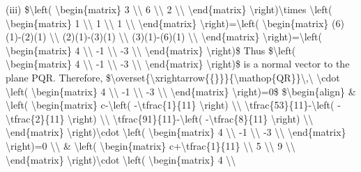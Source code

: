 (iii) \$\textbackslash left( \textbackslash begin\{matrix\} 3 \textbackslash\textbackslash{}
6 \textbackslash\textbackslash{} 2 \textbackslash\textbackslash{}
\textbackslash end\{matrix\} \textbackslash right)\textbackslash times
\textbackslash left( \textbackslash begin\{matrix\} 1 \textbackslash\textbackslash{}
1 \textbackslash\textbackslash{} 1 \textbackslash\textbackslash{}
\textbackslash end\{matrix\} \textbackslash right)=\textbackslash left(
\textbackslash begin\{matrix\} (6)(1)-(2)(1) \textbackslash\textbackslash{}
(2)(1)-(3)(1) \textbackslash\textbackslash{} (3)(1)-(6)(1) \textbackslash\textbackslash{}
\textbackslash end\{matrix\} \textbackslash right)=\textbackslash left(
\textbackslash begin\{matrix\} 4 \textbackslash\textbackslash{}
-1 \textbackslash\textbackslash{} -3 \textbackslash\textbackslash{}
\textbackslash end\{matrix\} \textbackslash right)\$ Thus \$\textbackslash left(
\textbackslash begin\{matrix\} 4 \textbackslash\textbackslash{}
-1 \textbackslash\textbackslash{} -3 \textbackslash\textbackslash{}
\textbackslash end\{matrix\} \textbackslash right)\$ is a normal
vector to the plane PQR. Therefore, \$\textbackslash overset\{\textbackslash xrightarrow\{\{\}\}\}\{\textbackslash mathop\{QR\}\}\textbackslash ,\textbackslash{}
\textbackslash cdot \textbackslash left( \textbackslash begin\{matrix\}
4 \textbackslash\textbackslash{} -1 \textbackslash\textbackslash{}
-3 \textbackslash\textbackslash{} \textbackslash end\{matrix\}
\textbackslash right)=0\$ \$\textbackslash begin\{align\} \& \textbackslash left(
\textbackslash begin\{matrix\} c-\textbackslash left( -\textbackslash tfrac\{1\}\{11\}
\textbackslash right) \textbackslash\textbackslash{} \textbackslash tfrac\{53\}\{11\}-\textbackslash left(
-\textbackslash tfrac\{2\}\{11\} \textbackslash right) \textbackslash\textbackslash{}
\textbackslash tfrac\{91\}\{11\}-\textbackslash left( -\textbackslash tfrac\{8\}\{11\}
\textbackslash right) \textbackslash\textbackslash{} \textbackslash end\{matrix\}
\textbackslash right)\textbackslash cdot \textbackslash left( \textbackslash begin\{matrix\}
4 \textbackslash\textbackslash{} -1 \textbackslash\textbackslash{}
-3 \textbackslash\textbackslash{} \textbackslash end\{matrix\}
\textbackslash right)=0 \textbackslash\textbackslash{} \& \textbackslash left(
\textbackslash begin\{matrix\} c+\textbackslash tfrac\{1\}\{11\}
\textbackslash\textbackslash{} 5 \textbackslash\textbackslash{}
9 \textbackslash\textbackslash{} \textbackslash end\{matrix\} \textbackslash right)\textbackslash cdot
\textbackslash left( \textbackslash begin\{matrix\} 4 \textbackslash\textbackslash{}

